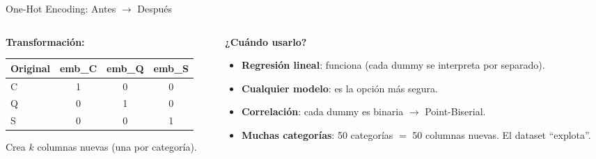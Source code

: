 \documentclass[aspectratio=169, 11pt]{beamer}
\begin{document}
\begin{frame}[shrink=5]{One-Hot Encoding: Antes $\to$ Después}
  \vspace{-4pt}
  \begin{columns}[T]
    \begin{column}{0.40\textwidth}
      {\footnotesize\bfseries\color{arcaDark} Transformación:}
      \vspace{4pt}

      {\scriptsize
      \begin{tabular}{@{}lccc@{}}
        \toprule
        \textbf{Original} & \textbf{emb\_C} & \textbf{emb\_Q} & \textbf{emb\_S} \\
        \midrule
        C & 1 & 0 & 0 \\
        Q & 0 & 1 & 0 \\
        S & 0 & 0 & 1 \\
        \bottomrule
      \end{tabular}
      }

      \vspace{6pt}
      {\scriptsize\color{arcaDark}
        \faLightbulb\hspace{4pt}
        Crea $k$ columnas nuevas
        (una por categoría).}
    \end{column}

    \begin{column}{0.55\textwidth}
      {\footnotesize\bfseries\color{arcaDark} ¿Cuándo usarlo?}
      \vspace{4pt}

      {\scriptsize
      \begin{itemize}\setlength{\itemsep}{4pt}
        \item[{\color{codeGreen}\faCheckCircle}]
          \textbf{Regresión lineal}: funciona (cada dummy
          se interpreta por separado).
        \item[{\color{codeGreen}\faCheckCircle}]
          \textbf{Cualquier modelo}: es la opción más segura.
        \item[{\color{codeGreen}\faCheckCircle}]
          \textbf{Correlación}: cada dummy es binaria $\to$ Point-Biserial.
        \item[{\color{codeOrange}\faExclamationTriangle}]
          \textbf{Muchas categorías}: 50 categorías $=$ 50 columnas
          nuevas. El dataset ``explota''.
      \end{itemize}
      }
    \end{column}
  \end{columns}
\end{frame}
\end{document}
